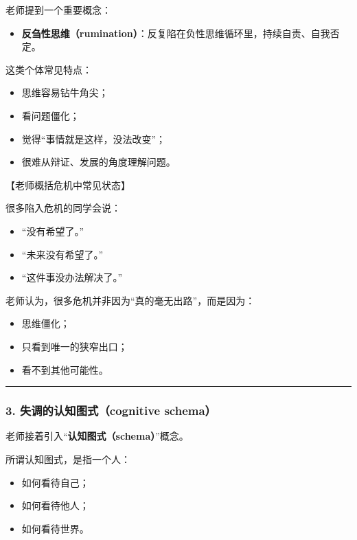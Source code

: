 \documentclass[
  chinese,
  9pt,
  a4paper,
]{ctexart}
\providecommand{\tightlist}{%
  \setlength{\itemsep}{0pt}\setlength{\parskip}{0pt}}
\begin{document}
老师提到一个重要概念：

\begin{itemize}
\tightlist
\item
  \textbf{反刍性思维（rumination）}：反复陷在负性思维循环里，持续自责、自我否定。
\end{itemize}

这类个体常见特点：

\begin{itemize}
\tightlist
\item
  思维容易钻牛角尖；
\item
  看问题僵化；
\item
  觉得``事情就是这样，没法改变''；
\item
  很难从辩证、发展的角度理解问题。
\end{itemize}

【老师概括危机中常见状态】

很多陷入危机的同学会说：

\begin{itemize}
\tightlist
\item
  ``没有希望了。''
\item
  ``未来没有希望了。''
\item
  ``这件事没办法解决了。''
\end{itemize}

老师认为，很多危机并非因为``真的毫无出路''，而是因为：

\begin{itemize}
\tightlist
\item
  思维僵化；
\item
  只看到唯一的狭窄出口；
\item
  看不到其他可能性。
\end{itemize}

\begin{center}\rule{0.5\linewidth}{0.5pt}\end{center}

\subsubsection{3. 失调的认知图式（cognitive
schema）}\label{ux5931ux8c03ux7684ux8ba4ux77e5ux56feux5f0fcognitive-schema}

老师接着引入``\textbf{认知图式（schema）}''概念。

所谓认知图式，是指一个人：

\begin{itemize}
\tightlist
\item
  如何看待自己；
\item
  如何看待他人；
\item
  如何看待世界。
\end{itemize}
\end{document}
